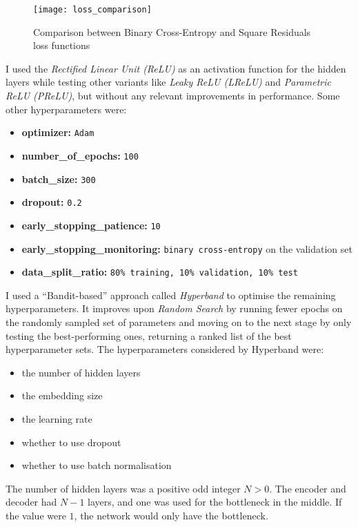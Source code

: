 \begin{figure}[H]
  \centering
  \texttt{[image: loss\_comparison]}
  \caption{Comparison between Binary Cross-Entropy and Square Residuals loss functions}
  \label{fig:loss_comparison}
\end{figure}

I used the \textit{Rectified Linear Unit (ReLU)} as an activation function for the hidden layers
while testing other variants like \textit{Leaky ReLU (LReLU)} and \textit{Parametric ReLU (PReLU)},
but without any relevant improvements in performance.
Some other hyperparameters were:

\begin{itemize}
  \item \textbf{optimizer:} \verb|Adam|
  \item \textbf{number\_of\_epochs:} \verb|100|
  \item \textbf{batch\_size:} \verb|300|
  \item \textbf{dropout:} \verb|0.2|
  \item \textbf{early\_stopping\_patience:} \verb|10|
  \item \textbf{early\_stopping\_monitoring:} \verb|binary cross-entropy| on the validation set
  \item \textbf{data\_split\_ratio:} \verb|80% training, 10% validation, 10% test|
\end{itemize}

I used a ``Bandit-based'' approach called \textit{Hyperband} \cite{DBLP:journals/corr/LiJDRT16} to optimise the remaining hyperparameters.
It improves upon \textit{Random Search} by running fewer epochs on the randomly sampled set of parameters
and moving on to the next stage by only testing the best-performing ones, returning a ranked list of the best hyperparameter sets.
The hyperparameters considered by Hyperband were:

\begin{itemize}
  \item the number of hidden layers
  \item the embedding size
  \item the learning rate
  \item whether to use dropout
  \item whether to use batch normalisation
\end{itemize}

The number of hidden layers was a positive odd integer $N > 0$.
The encoder and decoder had $N-1$ layers, and one was used for the bottleneck in the middle.
If the value were $1$, the network would only have the bottleneck.

